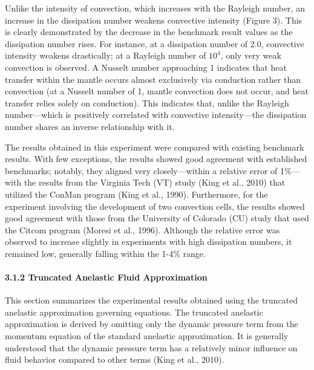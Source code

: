 Unlike the intensity of convection, which increases with the Rayleigh number, an increase in the dissipation number weakens convective 
intensity (Figure 3). This is clearly demonstrated by the decrease in the benchmark result values as the dissipation number rises. For 
instance, at a dissipation number of 2.0, convective intensity weakens drastically; at a Rayleigh number of $10^4$, 
only very weak convection is observed. A Nusselt number approaching 1 indicates that heat transfer within the mantle 
occurs almost exclusively via conduction rather than convection (at a Nusselt number of 1, mantle convection does not 
occur, and heat transfer relies solely on conduction). This indicates that, unlike the Rayleigh number—which is positively 
correlated with convective intensity—the dissipation number shares an inverse relationship with it.

The results obtained in this experiment were compared with existing benchmark results. With few exceptions, the results showed good agreement with established benchmarks; notably, they aligned very closely—within a relative error of 1\%—with the results from the Virginia Tech (VT) study (King et al., 2010) that utilized the ConMan program (King et al., 1990). Furthermore, for the experiment involving the development of two convection cells, the results showed good agreement with those from the University of Colorado (CU) study that used the Citcom program (Moresi et al., 1996). Although the relative error was observed to increase slightly in experiments with high dissipation numbers, it remained low, generally falling within the 1-4\% range.




\paragraph{3.1.2 Truncated Anelastic Fluid Approximation}
This section summarizes the experimental results obtained using the truncated anelastic approximation governing equations. The truncated anelastic approximation is derived by omitting only the dynamic pressure term from the momentum equation of the standard anelastic approximation. It is generally understood that the dynamic pressure term has a relatively minor influence on fluid behavior compared to other terms (King et al., 2010).

